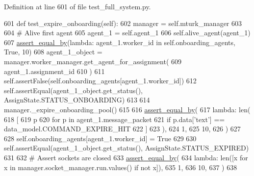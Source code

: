 Definition at line 601 of file test\+\_\+full\+\_\+system.\+py.


\begin{DoxyCode}
601     \textcolor{keyword}{def }test\_expire\_onboarding(self):
602         manager = self.mturk\_manager
603 
604         \textcolor{comment}{# Alive first agent}
605         agent\_1 = self.agent\_1
606         self.alive\_agent(agent\_1)
607         \hyperlink{namespaceparlai_1_1mturk_1_1core_1_1test_1_1test__full__system_a0b463246d35658a2e422010f13dcf819}{assert\_equal\_by}(\textcolor{keyword}{lambda}: agent\_1.worker\_id \textcolor{keywordflow}{in} self.onboarding\_agents, \textcolor{keyword}{True}, 10)
608         agent\_1\_object = manager.worker\_manager.get\_agent\_for\_assignment(
609             agent\_1.assignment\_id
610         )
611         self.assertFalse(self.onboarding\_agents[agent\_1.worker\_id])
612         self.assertEqual(agent\_1\_object.get\_status(), AssignState.STATUS\_ONBOARDING)
613 
614         manager.\_expire\_onboarding\_pool()
615 
616         \hyperlink{namespaceparlai_1_1mturk_1_1core_1_1test_1_1test__full__system_a0b463246d35658a2e422010f13dcf819}{assert\_equal\_by}(
617             \textcolor{keyword}{lambda}: len(
618                 [
619                     p
620                     \textcolor{keywordflow}{for} p \textcolor{keywordflow}{in} agent\_1.message\_packet
621                     \textcolor{keywordflow}{if} p.data[\textcolor{stringliteral}{'text'}] == data\_model.COMMAND\_EXPIRE\_HIT
622                 ]
623             ),
624             1,
625             10,
626         )
627 
628         self.onboarding\_agents[agent\_1.worker\_id] = \textcolor{keyword}{True}
629 
630         self.assertEqual(agent\_1\_object.get\_status(), AssignState.STATUS\_EXPIRED)
631 
632         \textcolor{comment}{# Assert sockets are closed}
633         \hyperlink{namespaceparlai_1_1mturk_1_1core_1_1test_1_1test__full__system_a0b463246d35658a2e422010f13dcf819}{assert\_equal\_by}(
634             \textcolor{keyword}{lambda}: len([x \textcolor{keywordflow}{for} x \textcolor{keywordflow}{in} manager.socket\_manager.run.values() \textcolor{keywordflow}{if} \textcolor{keywordflow}{not} x]),
635             1,
636             10,
637         )
638 
\end{DoxyCode}
\mbox{\label{classparlai_1_1mturk_1_1core_1_1legacy__2018_1_1test_1_1test__full__system_1_1TestMTurkManagerWorkflows_a9b6327cbeb64e4ddfb0154001660bede}} 
